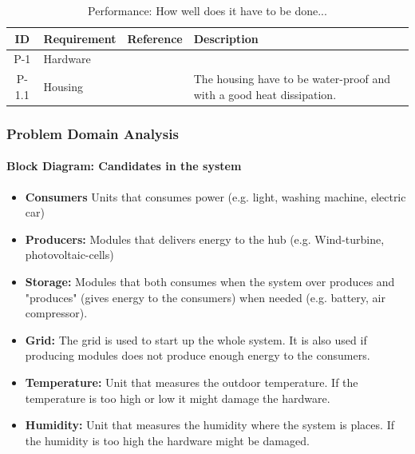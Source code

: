 		\begin{table}[h!]
			\begin{tabular} [b] {| c | p{3cm} | c | p{10cm} |}
			\hline
			\textbf{ID} & \textbf{Requirement} & \textbf{Reference} & \textbf{Description} \\ \hline
			P-1 & Hardware &  &  \\ \hline
			P-1.1 & Housing &  & The housing have to be water-proof and with a good heat dissipation. \\ \hline
		\end{tabular}
		\caption{Performance: How well does it have to be done...}
		\end{table}
		\newpage
	\subsubsection{Problem Domain Analysis}
			\paragraph{Block Diagram: Candidates in the system}
			\begin{itemize}
				\item \textbf{Consumers} Units that consumes power (e.g. light, washing machine, electric car)
				\item \textbf{Producers:} Modules that delivers energy to the hub (e.g. Wind-turbine, photovoltaic-cells)
				\item \textbf{Storage:} Modules that both consumes when the system over produces and "produces" (gives energy to the consumers) when needed (e.g. battery, air compressor). 
				\item \textbf{Grid:} The grid is used to start up the whole system. It is also used if producing modules does not produce enough energy to the consumers.
				\item \textbf{Temperature:} Unit that measures the outdoor temperature. If the temperature is too high or low it might damage the hardware.
				\item \textbf{Humidity:} Unit that measures the humidity where the system is places. If the humidity is too high the hardware might be damaged.
			\end{itemize}
